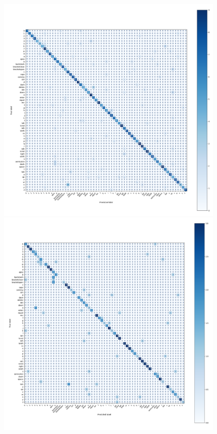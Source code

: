 \documentclass[a4paper,11pt,twoside]{report}
\theoremstyle{definition}
\begin{document}
\begin{figure}[h!]
  \vspace{1em}

  \begin{minipage}{0.49\linewidth}
      \centering
      \includegraphics[width=\linewidth]{img_results/cm_noisy_all_noisy.png}
      \subcaption{}
  \end{minipage}
  \hfill
  \begin{minipage}{0.49\linewidth}
      \centering
      \includegraphics[width=\linewidth]{img_results/cm_noisy_all_mac.png}
      \subcaption{}
  \end{minipage}


\end{figure}
\end{document}
